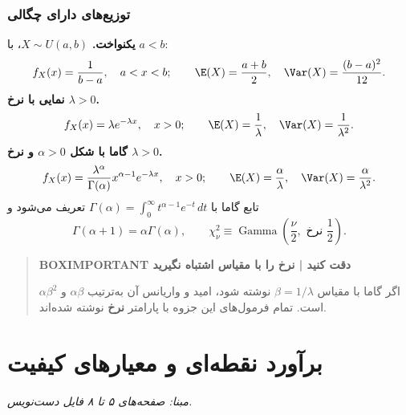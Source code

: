 \subsection{توزیع‌های دارای چگالی}
\textbf{یکنواخت.} $X\sim U(a,b)$، با $a<b$:
\[
f_X(x)=\frac1{b-a},\quad a<x<b;\qquad
\E(X)=\frac{a+b}{2},\quad\Var(X)=\frac{(b-a)^2}{12}.
\]
\textbf{نمایی با نرخ $\lambda>0$.}
\[
f_X(x)=\lambda e^{-\lambda x},\quad x>0;\qquad
\E(X)=\frac1\lambda,\quad\Var(X)=\frac1{\lambda^2}.
\]
\textbf{گاما با شکل $\alpha>0$ و نرخ $\lambda>0$.}
\[
f_X(x)=\frac{\lambda^\alpha}{\Gamma(\alpha)}x^{\alpha-1}e^{-\lambda x},\quad x>0;
\qquad\E(X)=\frac\alpha\lambda,\quad\Var(X)=\frac\alpha{\lambda^2}.
\]
تابع گاما با $\Gamma(\alpha)=\int_0^\infty t^{\alpha-1}e^{-t}\,dt$ تعریف می‌شود و
\[
\Gamma(\alpha+1)=\alpha\Gamma(\alpha),\qquad
\chi^2_\nu\equiv\operatorname{Gamma}\left(\frac\nu2,\text{ نرخ }\frac12\right).
\]
\begin{quote}\textbf{BOXIMPORTANT دقت کنید | نرخ را با مقیاس اشتباه نگیرید}\par 
اگر گاما با مقیاس $\beta=1/\lambda$ نوشته شود، امید و واریانس آن به‌ترتیب $\alpha\beta$ و $\alpha\beta^2$ است. تمام فرمول‌های این جزوه با پارامتر \textbf{نرخ} نوشته شده‌اند.
\end{quote}
\chapter{برآورد نقطه‌ای و معیارهای کیفیت}
\textit{مبنا: صفحه‌های ۵ تا ۸ فایل دست‌نویس.}\par 
